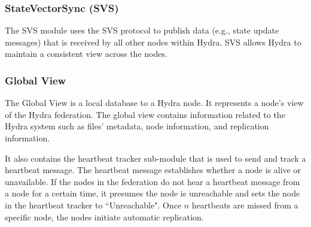 
\subsubsection{StateVectorSync (SVS)}

The SVS module uses the SVS protocol to publish data (e.g., state update messages) that is received by all other nodes within Hydra. SVS allows Hydra to maintain a consistent view across the nodes.

\subsubsection{Global View}
The Global View is a local database to a Hydra node. It represents a node's view of the Hydra federation. The global view contains information related to the Hydra system such as files' metadata, node information, and replication information.

It also contains the heartbeat tracker sub-module that is used to send and track a heartbeat message. The heartbeat message establishes whether a node is alive or unavailable.  If the nodes in the federation do not hear a heartbeat message from a node for a certain time, it presumes the node is unreachable and sets the node in the heartbeat tracker to ``Unreachable". Once $n$ heartbeats are missed from a specific node, the nodes initiate automatic replication.





